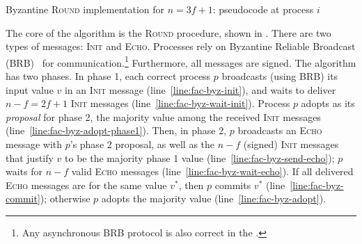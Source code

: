\begin{algorithm}
\caption{Byzantine \textsc{Round} implementation for $n=3f+1$: pseudocode at process $i$}
\label{alg:aac-byz}
\end{algorithm}

The core of the algorithm is the \textsc{Round} procedure, shown in . There are two types of messages: \textsc{Init} and \textsc{Echo}. Processes rely on Byzantine Reliable Broadcast (BRB)~\cite{book} for communication.\footnote{Any asynchronous BRB protocol is also correct in the \model.} Furthermore, all messages are signed. The algorithm has two phases. In phase 1, each correct process $p$ broadcasts (using BRB) its input value $v$ in an \textsc{Init} message (line~\ref{line:fac-byz-init}), and waits to deliver $n-f = 2f+1$ \textsc{Init} messages (line~\ref{line:fac-byz-wait-init}). Process $p$ adopts as its \textit{proposal} for phase 2, the majority value among the received \textsc{Init} messages (line~\ref{line:fac-byz-adopt-phase1}). Then, in phase 2, $p$ broadcasts an \textsc{Echo} message with $p$'s phase 2 proposal, as well as the $n-f$ (signed) \textsc{Init} messages that justify $v$ to be the majority phase 1 value (line~\ref{line:fac-byz-send-echo}); $p$ waits for $n-f$ valid \textsc{Echo} messages (line~\ref{line:fac-byz-wait-echo}). If all delivered \textsc{Echo} messages are for the same value $v^*$, then $p$ commits $v^*$ (line~\ref{line:fac-byz-commit}); otherwise $p$ adopts the majority value (line~\ref{line:fac-byz-adopt}).


